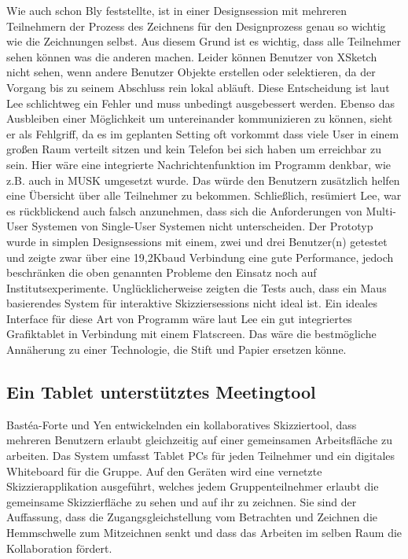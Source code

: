 Wie auch schon Bly feststellte, ist in einer Designsession mit mehreren Teilnehmern der Prozess des Zeichnens für den Designprozess genau so wichtig wie die Zeichnungen selbst. \citep{Bly:1988:UDS:62266.62286} Aus diesem Grund ist es wichtig, dass alle Teilnehmer sehen können was die anderen machen. Leider können Benutzer von XSketch nicht sehen, wenn andere Benutzer Objekte erstellen oder selektieren, da der Vorgang bis zu seinem Abschluss rein lokal abläuft. Diese Entscheidung ist laut Lee schlichtweg ein Fehler und muss unbedingt ausgebessert werden. Ebenso das Ausbleiben einer Möglichkeit um untereinander kommunizieren zu können, sieht er als Fehlgriff, da es im geplanten Setting oft vorkommt dass viele User in einem großen Raum verteilt sitzen und kein Telefon bei sich haben um erreichbar zu sein. Hier wäre eine integrierte Nachrichtenfunktion im Programm denkbar, wie z.B. auch in MUSK \citep{Crampton:1987} umgesetzt wurde. Das würde den Benutzern zusätzlich helfen eine Übersicht über alle Teilnehmer zu bekommen. 
Schließlich, resümiert Lee, war es rückblickend auch falsch anzunehmen, dass sich die Anforderungen von Multi-User Systemen von Single-User Systemen nicht unterscheiden. Der Prototyp wurde in simplen Designsessions mit einem, zwei und drei Benutzer(n) getestet und zeigte zwar über eine 19,2Kbaud Verbindung eine gute Performance, jedoch beschränken die oben genannten Probleme den Einsatz noch auf Institutsexperimente.
Unglücklicherweise zeigten die Tests auch, dass ein Maus basierendes System für interaktive Skizziersessions nicht ideal ist. Ein ideales Interface für diese Art von Programm wäre laut Lee ein gut integriertes Grafiktablet in Verbindung mit einem Flatscreen. Das wäre die bestmögliche Annäherung zu einer Technologie, die Stift und Papier ersetzen könne.

\subsection{Ein Tablet unterstütztes Meetingtool}
Bastéa-Forte und Yen entwickelnden ein kollaboratives Skizziertool, dass mehreren Benutzern erlaubt gleichzeitig auf einer gemeinsamen Arbeitsfläche zu arbeiten. Das System umfasst Tablet PCs für jeden Teilnehmer und ein digitales Whiteboard für die Gruppe. Auf den Geräten wird eine vernetzte Skizzierapplikation ausgeführt, welches jedem Gruppenteilnehmer erlaubt die gemeinsame Skizzierfläche zu sehen und auf ihr zu zeichnen. Sie sind der Auffassung, dass die Zugangsgleichstellung vom Betrachten und Zeichnen die Hemmschwelle zum Mitzeichnen senkt und dass das Arbeiten im selben Raum die Kollaboration fördert. 

